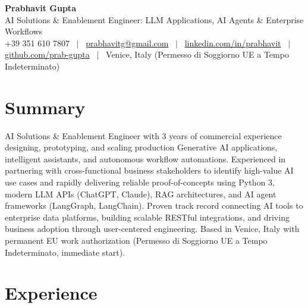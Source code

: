 \documentclass[a4paper,10pt]{article}
\begin{document}
\begin{minipage}[c]{0.80\textwidth}
  {\Huge\bfseries Prabhavit Gupta}\\[3pt]
  {\color{accent}\large AI Solutions \& Enablement Engineer: LLM Applications, AI Agents \& Enterprise Workflows}\\[6pt]
  {\footnotesize +39 351 610 7807 ~$\vert$~
  \href{mailto:prabhavitg@gmail.com}{prabhavitg@gmail.com} ~$\vert$~
  \href{https://www.linkedin.com/in/prabhavit/}{linkedin.com/in/prabhavit} ~$\vert$~
  \href{https://github.com/prab-gupta}{github.com/prab-gupta} ~$\vert$~
  Venice, Italy (Permesso di Soggiorno UE a Tempo Indeterminato)}
\end{minipage}\hfill

\section{Summary}
AI Solutions \& Enablement Engineer with 3 years of commercial experience designing, prototyping, and scaling production Generative AI applications, intelligent assistants, and autonomous workflow automations. Experienced in partnering with cross-functional business stakeholders to identify high-value AI use cases and rapidly delivering reliable proof-of-concepts using Python 3, modern LLM APIs (ChatGPT, Claude), RAG architectures, and AI agent frameworks (LangGraph, LangChain). Proven track record connecting AI tools to enterprise data platforms, building scalable RESTful integrations, and driving business adoption through user-centered engineering. Based in Venice, Italy with permanent EU work authorization (Permesso di Soggiorno UE a Tempo Indeterminato, immediate start).

\section{Experience}
\end{document}
